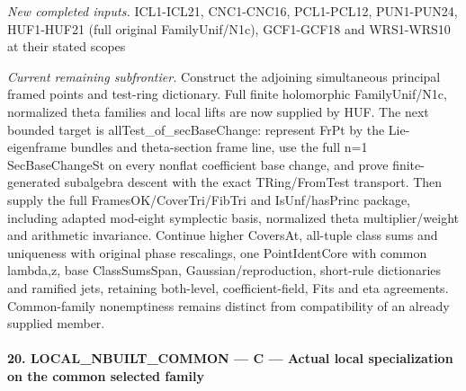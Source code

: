 \documentclass[11pt,a4paper]{article}
\numberwithin{equation}{section}
\theoremstyle{remark}\newtheorem{remark}[theorem]{Remark}
\begin{document}
\emph{New completed inputs.} ICL1-ICL21, CNC1-CNC16, PCL1-PCL12, PUN1-PUN24, HUF1-HUF21 (full original FamilyUnif/N1c), GCF1-GCF18 and WRS1-WRS10 at their stated scopes

\emph{Current remaining subfrontier.} Construct the adjoining simultaneous principal framed points and test-ring dictionary. Full finite holomorphic FamilyUnif/N1c, normalized theta families and local lifts are now supplied by HUF. The next bounded target is allTest\_\allowbreak of\_\allowbreak secBaseChange: represent FrPt by the Lie-eigenframe bundles and theta-section frame line, use the full n=1 SecBaseChangeSt on every nonflat coefficient base change, and prove finite-generated subalgebra descent with the exact TRing/FromTest transport. Then supply the full FramesOK/CoverTri/FibTri and IsUnf/hasPrinc package, including adapted mod-eight symplectic basis, normalized theta multiplier/weight and arithmetic invariance. Continue higher CoversAt, all-tuple class sums and uniqueness with original phase rescalings, one PointIdentCore with common lambda,z, base ClassSumsSpan, Gaussian/reproduction, short-rule dictionaries and ramified jets, retaining both-level, coefficient-field, Fits and eta agreements. Common-family nonemptiness remains distinct from compatibility of an already supplied member.



\paragraph{20. LOCAL\_\allowbreak NBUILT\_\allowbreak COMMON — C — Actual local specialization on the common selected family}
\end{document}
